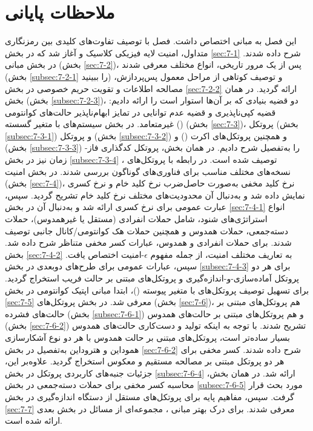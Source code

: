 \section{ملاحظات پایانی}
\label{sec:7-8}
این فصل به مبانی  اختصاص داشت. فصل با توصیف تفاوت‌های کلیدی بین رمزنگاری متداول، امنیت لایه فیزیکی کلاسیک و  آغاز شد که در بخش \ref{sec:7-1} شرح داده شدند. در بخش مبانی  (بخش \ref{sec:7-2})، پس از یک مرور تاریخی، انواع مختلف  معرفی شدند (بخش \ref{subsec:7-2-1} را ببینید) و توصیف کوتاهی از مراحل معمول پس‌پردازش، مصالحه اطلاعات و تقویت حریم خصوصی در بخش \ref{sec:7-2-2} ارائه گردید. در همان بخش (بخش \ref{subsec:7-2-3})، دو قضیه بنیادی که  بر آن‌ها استوار است را ارائه دادیم: قضیه کپی‌ناپذیری و قضیه عدم توانایی در تمایز ابهام‌ناپذیر حالت‌های کوانتومی غیرمتعامد. در بخش سیستم‌های  با متغیر گسسته () (بخش \ref{sec:7-3})، پروتکل  (بخش \ref{subsec:7-3-1}) و پروتکل  (بخش \ref{subsec:7-3-2}) و همچنین پروتکل‌های اکرت () و  (بخش \ref{subsec:7-3-3}) را به‌تفصیل شرح دادیم. در همان بخش، پروتکل کدگذاری فاز-زمان نیز در بخش \ref{subsec:7-3-4} توصیف شده است. در رابطه با پروتکل‌های ، نسخه‌های مختلف مناسب برای فناوری‌های گوناگون بررسی شدند. در بخش امنیت  (بخش \ref{sec:7-4})، نرخ کلید مخفی به‌صورت حاصل‌ضرب نرخ کلید خام و نرخ کسری نمایش داده شد و به‌دنبال آن محدودیت‌های مختلف نرخ کلید خام تشریح گردید. سپس، عبارت عمومی برای نرخ کسری ارائه شد و به‌دنبال آن در بخش \ref{sec:7-4-1} انواع استراتژی‌های شنود، شامل حملات انفرادی (مستقل یا غیرهمدوس)، حملات دسته‌جمعی، حملات همدوس و همچنین حملات هک کوانتومی/کانال جانبی توصیف شدند. برای حملات انفرادی و همدوس، عبارات کسر مخفی متناظر شرح داده شد. بخش \ref{sec:7-4-2} به تعاریف مختلف امنیت، از جمله مفهوم $\epsilon$-امنیت اختصاص یافت. سپس، عبارات عمومی برای طرح‌های  دوبعدی در بخش \ref{subsec:7-4-3} برای هر دو پروتکل آماده‌سازی-و-اندازه‌گیری و پروتکل‌های مبتنی بر حالت فریب استخراج گردید. برای تسهیل توصیف پروتکل‌های  با متغیر پیوسته ()، ابتدا مبانی اپتیک کوانتومی در بخش \ref{sec:7-5} معرفی شد. در بخش پروتکل‌های  (بخش \ref{sec:7-6})، هم پروتکل‌های مبتنی بر حالت‌های فشرده (بخش \ref{subsec:7-6-1}) و هم پروتکل‌های مبتنی بر حالت‌های همدوس (بخش \ref{sec:7-6-2}) تشریح شدند. با توجه به اینکه تولید و دست‌کاری حالت‌های همدوس بسیار ساده‌تر است، پروتکل‌های مبتنی بر حالت همدوس با هر دو نوع آشکارسازی هموداین و هتروداین به‌تفصیل در بخش \ref{sec:7-6-2} شرح داده شدند. کسر مخفی برای هر دو پروتکل  مبتنی بر مصالحه مستقیم و معکوس استخراج گردید. علاوه‌بر این، جزئیات جنبه‌های کاربردی پروتکل  در بخش \ref{subsec:7-6-4} ارائه شد. در همان بخش، محاسبه کسر مخفی برای حملات دسته‌جمعی در بخش \ref{subsec:7-6-5} مورد بحث قرار گرفت. سپس، مفاهیم پایه برای پروتکل‌های  مستقل از دستگاه اندازه‌گیری در بخش \ref{sec:7-7} معرفی شدند. برای درک بهتر مبانی ، مجموعه‌ای از مسائل در بخش بعدی ارائه شده است.











